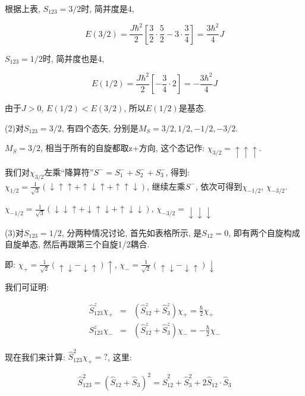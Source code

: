 根据上表, $S_{123}=3/2$时, 简并度是4,

\begin{equation*}
E(3/2)= \frac{{J\hbar ^2 }} {2}\left[ {\frac{3} {2} \cdot \frac{5}
{2} - 3 \cdot \frac{3} {4}} \right] = \frac{{3\hbar ^2 }} {4}J
\end{equation*}

$S_{123}=1/2$时, 简并度也是4,

\begin{equation*}
E(1/2) = \frac{{J\hbar ^2 }} {2}\left[ { - \frac{3} {4} \cdot 2}
\right] =  - \frac{{3\hbar ^2 }} {4}J
\end{equation*}

由于$J>0$, $E(1/2)< E(3/2)$, 所以$E(1/2)$是基态.

(2)对$S_{123}=3/2$, 有四个态矢, 分别是$M_S = 3/2, 1/2, -1/2, -3/2$.

$M_S=3/2$, 相当于所有的自旋都取z+方向, 这个态记作: $\chi_{3/2} =
\uparrow \uparrow \uparrow$.

我们对$\chi_{3/2}$左乘``降算符''$S^-=S_1^- + S_2^- + S_3^-$, 得到:
$\chi_{1/2} = \frac{1} {{\sqrt 3 }}\left( { \downarrow  \uparrow
\uparrow  +  \uparrow  \downarrow  \uparrow  +  \uparrow  \uparrow
\downarrow } \right)$, 继续左乘$S^-$, 依次可得到$\chi_{-1/2}$,
$\chi_{-3/2}$.

$\chi _{ - 1/2}  = \frac{1} {{\sqrt 3 }}\left( { \downarrow
\downarrow  \uparrow  +  \downarrow  \uparrow  \downarrow  +
\uparrow  \downarrow  \downarrow } \right)$, $\chi _{ - 3/2}  =
\downarrow  \downarrow  \downarrow $

(3)对$S_{123}=1/2$, 分两种情况讨论, 首先如表格所示, 是$S_{12}=0$,
即有两个自旋构成自旋单态, 然后再跟第三个自旋1/2耦合.

即: $\chi_+ = \frac{1} {{\sqrt 2 }}\left( { \uparrow  \downarrow  -
\downarrow  \uparrow } \right) \uparrow $, $\chi_- = \frac{1}
{{\sqrt 2 }}\left( { \uparrow  \downarrow  - \downarrow  \uparrow }
\right) \downarrow$

我们可证明:

\begin{eqnarray*}
\hat S_{123}^z \chi_+ &=& (\hat S_{12}^z + \hat S_3^z ) \chi_+ =
\frac{\hbar}{2} \chi_+ \\
S_{123}^z \chi_- &=& (\hat S_{12}^z + \hat S_3^z ) \chi_- = -
\frac{\hbar}{2} \chi_-
\end{eqnarray*}

现在我们来计算: $\hat S_{123}^2 \chi_+ =? $, 这里:

\begin{equation*}
\hat S_{123}^2 = (\hat S_{12} + \hat S_3)^2 = \hat S_{12}^2 + \hat
S_3^2 + 2 \hat S_{12} \cdot \hat S_3
\end{equation*}

